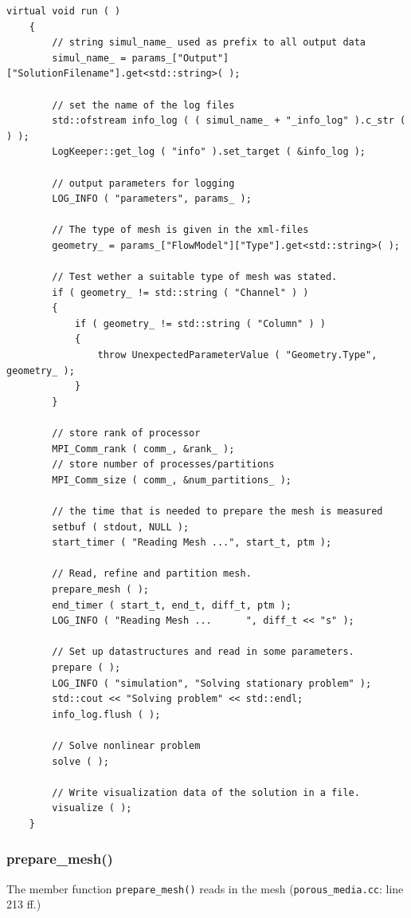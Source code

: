 \documentclass{article}
\begin{document}
\begin{lstlisting}[firstnumber=39]
    virtual void run ( )
    {
        // string simul_name_ used as prefix to all output data
        simul_name_ = params_["Output"]["SolutionFilename"].get<std::string>( );

        // set the name of the log files
        std::ofstream info_log ( ( simul_name_ + "_info_log" ).c_str ( ) );
        LogKeeper::get_log ( "info" ).set_target ( &info_log );

        // output parameters for logging
        LOG_INFO ( "parameters", params_ );

        // The type of mesh is given in the xml-files
        geometry_ = params_["FlowModel"]["Type"].get<std::string>( );

        // Test wether a suitable type of mesh was stated.
        if ( geometry_ != std::string ( "Channel" ) )
        {
            if ( geometry_ != std::string ( "Column" ) )
            {
                throw UnexpectedParameterValue ( "Geometry.Type", geometry_ );
            }
        }

        // store rank of processor
        MPI_Comm_rank ( comm_, &rank_ );
        // store number of processes/partitions
        MPI_Comm_size ( comm_, &num_partitions_ );

        // the time that is needed to prepare the mesh is measured
        setbuf ( stdout, NULL );
        start_timer ( "Reading Mesh ...", start_t, ptm );

        // Read, refine and partition mesh.
        prepare_mesh ( );
        end_timer ( start_t, end_t, diff_t, ptm );
        LOG_INFO ( "Reading Mesh ...      ", diff_t << "s" );

        // Set up datastructures and read in some parameters.
        prepare ( );
        LOG_INFO ( "simulation", "Solving stationary problem" );
        std::cout << "Solving problem" << std::endl;
        info_log.flush ( );

        // Solve nonlinear problem
        solve ( );

        // Write visualization data of the solution in a file.
        visualize ( );
    }
\end{lstlisting}

\subsubsection{prepare\_mesh()}

The member function \texttt{prepare\_mesh()} reads in the mesh (\texttt{porous\_media.cc}: line 213 ff.)
\end{document}
